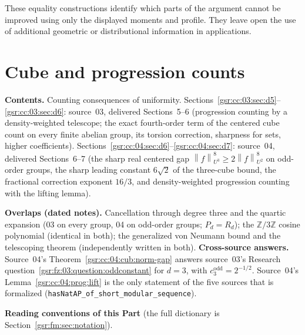 \documentclass[11pt,letterpaper]{article}
\numberwithin{equation}{section}
\theoremstyle{definition}
\theoremstyle{remark}
\newcommand{\Z}{\mathbb Z}
\newcommand{\1}{\mathbf 1}
\newcommand{\norm}[1]{\left\|#1\right\|}
\newcommand{\file}[1]{\nolinkurl{#1}}
\newcommand{\partsource}[1]{\par\noindent\begin{minipage}{\textwidth}\small #1\end{minipage}\par\medskip}
\begin{document}
These equality constructions identify which parts of the
argument cannot be improved using only the displayed moments
and profile.  They leave open the use of additional geometric
or distributional information in applications.



\clearpage
\part{Cube and progression counts}\label{gsr:cc:part}
\partsource{
\textbf{Contents.} Counting consequences of uniformity. Sections~\ref{gsr:cc:03:sec:d5}--\ref{gsr:cc:03:sec:d6}: source~03, delivered Sections~5--6 (progression counting by a density-weighted telescope; the exact fourth-order term of the centered cube count on every finite abelian group, its torsion correction, sharpness for sets, higher coefficients). Sections~\ref{gsr:cc:04:sec:d6}--\ref{gsr:cc:04:sec:d7}: source~04, delivered Sections~6--7 (the sharp real centered gap $\norm f_{U^3}^8\ge2\norm f_{U^2}^8$ on odd-order groups, the sharp leading constant $6\sqrt2$ of the three-cube bound, the fractional correction exponent $16/3$, and density-weighted progression counting with the lifting lemma).

\textbf{Overlaps (dated notes).} Cancellation through degree three and the quartic expansion (03 on every group, 04 on odd-order groups; $P_d=R_d$); the $\Z/3\Z$ cosine polynomial (identical in both); the generalized von Neumann bound and the telescoping theorem (independently written in both). \textbf{Cross-source answers.} Source~04's Theorem~\ref{gsr:cc:04:cub:norm-gap} answers source~03's Research question~\ref{gsr:fz:03:question:oddconstant} for $d=3$, with $c_3^{\mathrm{odd}}=2^{-1/2}$. Source~04's Lemma~\ref{gsr:cc:04:prog:lift} is the only statement of the five sources that is formalized (\file{hasNatAP_of_short_modular_sequence}).
}
\noindent\textbf{Reading conventions of this Part} (the full dictionary is Section~\ref{gsr:fm:sec:notation}).
\end{document}
